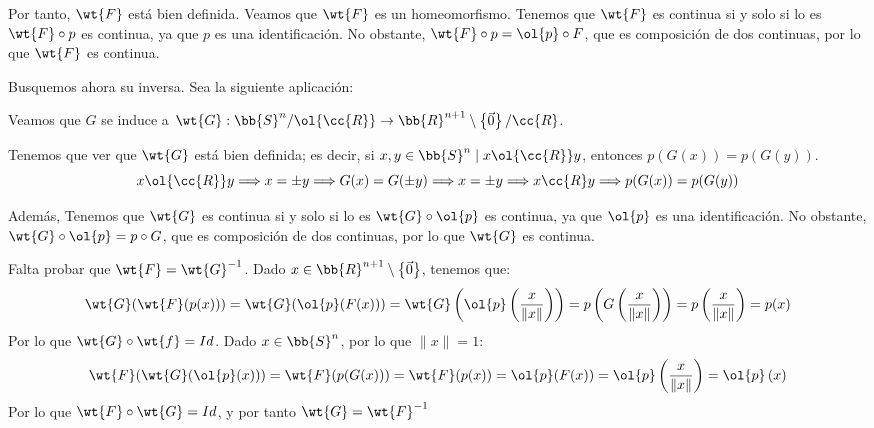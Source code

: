 \begin{ejemplo}
\begin{enumerate}
        Por tanto, $\wt{F}$ está bien definida. Veamos que $\wt{F}$ es un homeomorfismo. Tenemos que $\wt{F}$ es continua si y solo si lo es $\wt{F}\circ p$ es continua, ya que $p$ es una identificación. No obstante, $\wt{F}\circ p = \ol{p}\circ F$, que es composición de dos continuas, por lo que $\wt{F}$ es continua.


        Busquemos ahora su inversa. Sea la siguiente aplicación:

        Veamos que $G$ se induce a $\wt{G}:\bb{S}^n/\ol{\cc{R}}\to \bb{R}^{n+1}\setminus \left\{\vec{0}\right\}/\cc{R}$.
        \begin{figure}[H]
            \centering
        \end{figure}
        Tenemos que ver que $\wt{G}$ está bien definida; es decir, si $x,y\in \bb{S}^n\mid x\ol{\cc{R}}y$, entonces $p(G(x))=p(G(y))$.
        \begin{equation*}
            x\ol{\cc{R}}y \Longrightarrow x=\pm y\Longrightarrow G(x) = G(\pm y)\Longrightarrow x=\pm y \Longrightarrow x\cc{R}y \Longrightarrow p(G(x)) = p(G(y))
        \end{equation*}

        Además, Tenemos que $\wt{G}$ es continua si y solo si lo es $\wt{G}\circ \ol{p}$ es continua, ya que $\ol{p}$ es una identificación. No obstante, $\wt{G}\circ \ol{p} = p\circ G$, que es composición de dos continuas, por lo que $\wt{G}$ es continua.

        Falta probar que $\wt{F}=\wt{G}^{-1}$. Dado $x\in \bb{R}^{n+1}\setminus\left\{\vec{0}\right\}$, tenemos que:
        \begin{equation*}
            \wt{G}(\wt{F}(p(x))) = \wt{G}(\ol{p}(F(x))) = \wt{G}\left(\ol{p}\left(\frac{x}{\|x\|}\right)\right) = p\left(G\left(\frac{x}{\|x\|}\right)\right) = p\left(\frac{x}{\|x\|}\right) = p(x)
        \end{equation*}
        Por lo que $\wt{G}\circ \wt{f}=Id$. Dado $x\in \bb{S}^n$, por lo que $\|x\|=1$:
        \begin{equation*}
            \wt{F}(\wt{G}(\ol{p}(x))) = \wt{F}(p(G(x))) = \wt{F}(p(x)) = \ol{p}(F(x)) = \ol{p}\left(\frac{x}{\|x\|}\right)
            = \ol{p}\left(x\right)
        \end{equation*}
        Por lo que $\wt{F}\circ \wt{G}=Id$, y por tanto $\wt{G}=\wt{F}^{-1}$


\end{enumerate}
\end{ejemplo}
